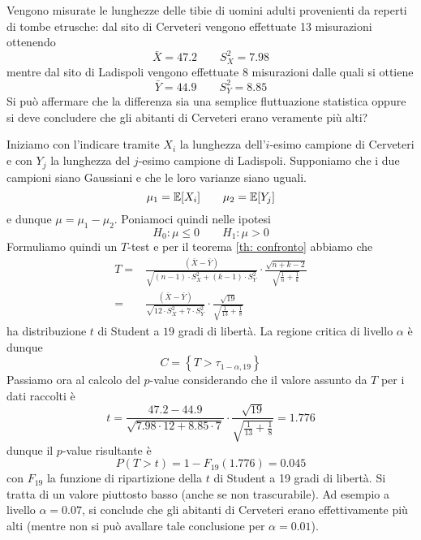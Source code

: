 \begin{example}
	Vengono misurate le lunghezze delle tibie di uomini adulti provenienti da reperti di tombe
	etrusche: dal sito di Cerveteri vengono effettuate 13 misurazioni ottenendo
	\[ \bar{X} = 47.2 \qquad S_X^2 = 7.98 \]
	mentre dal sito di Ladispoli vengono effettuate 8 misurazioni dalle quali si ottiene
	\[ \bar{Y} = 44.9 \qquad S_Y^2 = 8.85 \]
	Si può affermare che la differenza sia una semplice fluttuazione statistica oppure si deve
	concludere che gli abitanti di Cerveteri erano veramente più alti?

	Iniziamo con l'indicare tramite $X_i$ la lunghezza dell'$i$-esimo campione di Cerveteri e con
	$Y_j$ la lunghezza del $j$-esimo campione di Ladispoli. Supponiamo che i due campioni siano
	Gaussiani e che le loro varianze siano uguali.
	\[ \mu_1 = \mathbb{E}[X_i] \qquad \mu_2 = \mathbb{E}[Y_j] \]
	e dunque $\mu = \mu_1 - \mu_2$. Poniamoci quindi nelle ipotesi
	\[ H_0 : \mu \leq 0 \qquad H_1 : \mu > 0 \]
	Formuliamo quindi un $T$-test e per il teorema \ref{th: confronto} abbiamo che
	\begin{align*}
		T = & \frac{(\bar{X} - \bar{Y})}
		{\sqrt{(n-1) \cdot S_X^2 + (k-1) \cdot S_Y^2}} \cdot
		\frac{\sqrt{n+k-2}}{\sqrt{\frac{1}{n} + \frac{1}{k}}} \\
		=   & \frac{(\bar{X} - \bar{Y})}
		{\sqrt{12 \cdot S_X^2 + 7 \cdot S_Y^2}} \cdot
		\frac{\sqrt{19}}{\sqrt{\frac{1}{13} + \frac{1}{8}}}
	\end{align*}
	ha distribuzione $t$ di Student a $19$ gradi di libertà. La regione critica di livello $\alpha$
	è dunque
	\[ C = \left\{ T > \tau_{1 - \alpha, 19} \right\} \]
	Passiamo ora al calcolo del $p$-value considerando che il valore assunto da $T$ per i dati
	raccolti è
	\[
		t = \frac{47.2 - 44.9}{\sqrt{7.98 \cdot 12 + 8.85 \cdot 7}} \cdot
		\frac{\sqrt{19}}{\sqrt{\frac{1}{13} + \frac{1}{8}}} = 1.776
	\]
	dunque il $p$-value risultante è
	\[ P(T > t) = 1 - F_{19} (1.776) = 0.045 \]
	con $F_{19}$ la funzione di ripartizione della $t$ di Student a 19 gradi di libertà. Si tratta
	di un valore piuttosto basso (anche se non trascurabile). Ad esempio a livello $\alpha = 0.07$,
	si conclude che gli abitanti di Cerveteri erano effettivamente più alti (mentre non si può
	avallare tale conclusione per $\alpha = 0.01$).
\end{example}
